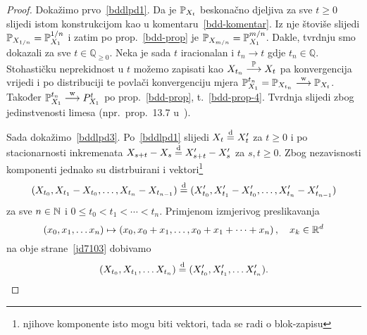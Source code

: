\documentclass[main.tex]{subfiles}
\begin{document}
\begin{proof}
	Dokažimo prvo~\ref{bddlpd1}. Da je \( \P_{X_t} \) beskonačno djeljiva za sve \( t \geq 0 \) slijedi istom konstrukcijom kao u komentaru~\ref{bdd-komentar}. Iz nje štoviše slijedi
	\( \P_{X_{1/n}} = \P_{X_1}^{1/n} \) i zatim po prop.~\ref{bdd-prop} je  \( \P_{X_{m/n}} = \P_{X_1}^{m/n} \). Dakle, tvrdnju smo dokazali za sve \( t \in \mathbb Q_{\ge 0} \).
	Neka je sada \( t \) iracionalan i \( t_n \rightarrow t \) gdje \( t_n \in \mathbb Q \). Stohastičku neprekidnost u \( t \) možemo zapisati kao \( X_{t_n} \konvp X_{t} \) pa konvergencija vrijedi i po distribuciji
	te povlači konvergenciju mjera \( \P_{X_1}^{t_n} = \P_{X_{t_n}} \konvw \P_{X_t} \). Također \( \P_{X_1}^{t_n} \konvw P_{X_1}^t \) po prop.~\ref{bdd-prop}, t.~\ref{bdd-prop-4}. Tvrdnja slijedi zbog jedinstvenosti limesa (npr.\ prop.~13.7 u~\cite{sarapa}).

	Sada dokažimo~\ref{bddlpd3}. Po~\ref{bddlpd1} slijedi \( X_t \jpod X_t' \) za \( t \ge 0 \) i po stacionarnosti inkremenata \( X_{s+t}-X_s \jpod X_{s+t}'-X_s' \) za \( s, t \ge 0 \). Zbog nezavisnosti komponenti jednako su distrbuirani i vektori\footnote{njihove komponente isto mogu biti vektori, tada se radi o blok-zapisu}
	\begin{equation} \label{jd7103}
		( X_{t_0}, X_{t_1}-X_{t_0}, \ldots, X_{t_n}-X_{t_{n-1}}  )
		\jpod
		( X_{t_0}', X_{t_1}'-X_{t_0}', \ldots, X_{t_n}'-X_{t_{n-1}}'  )
	\end{equation}
	za sve \( n \in \N \) i \( 0 \le t_0 < t_1 < \cdots < t_n \). Primjenom
	izmjerivog preslikavanja
	\[
		\left( x_0, x_1, \ldots x_n \right) \mapsto \left( x_0, x_0 + x_1, \ldots, x_0 + x_1 + \cdots + x_n  \right), \quad x_k \in \R^d
	\]
	na obje strane~\eqref{jd7103} dobivamo
	\[
		( X_{t_0}, X_{t_1}, \ldots X_{t_n} )
		\jpod
		( X_{t_0}', X_{t_1}', \ldots X_{t_n}' ).
	\]


\end{proof}
\end{document}
